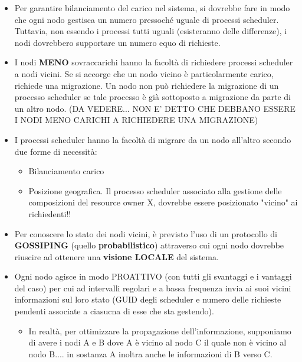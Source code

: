 \documentclass[10pt,a4paper]{article}
\begin{document}
\begin{itemize}
\item Per garantire bilanciamento del carico nel sistema, si dovrebbe fare in modo che ogni nodo gestisca un numero pressoché uguale di processi scheduler. Tuttavia, non essendo i processi tutti uguali (esisteranno delle differenze), i nodi dovrebbero supportare un numero equo di richieste.

\item I nodi \textbf{MENO} sovraccarichi hanno la facoltà di richiedere processi scheduler a nodi vicini. Se si accorge che un nodo vicino è particolarmente carico, richiede una migrazione. Un nodo non può richiedere la migrazione di un processo scheduler se tale processo è già sottoposto a migrazione da parte di un altro nodo. (DA VEDERE... NON E' DETTO CHE DEBBANO ESSERE I NODI MENO CARICHI A RICHIEDERE UNA MIGRAZIONE)

\item I processi scheduler hanno la facoltà di migrare da un nodo all'altro secondo due forme di necessità:
\begin{itemize}
\item Bilanciamento carico
\item Posizione geografica. Il processo scheduler associato alla gestione delle composizioni del resource owner X, dovrebbe essere posizionato "vicino" ai richiedenti!!
\end{itemize}

\item Per conoscere lo stato dei nodi vicini, è previsto l'uso di un protocollo di \textbf{GOSSIPING} (quello \textbf{probabilistico}) attraverso cui ogni nodo dovrebbe riuscire ad ottenere una \textbf{visione LOCALE} del sistema.

\item Ogni nodo agisce in modo PROATTIVO (con tutti gli svantaggi e i vantaggi del caso) per cui ad intervalli regolari e a bassa frequenza invia ai suoi vicini informazioni sul loro stato (GUID degli scheduler e numero delle richieste pendenti associate a ciasucna di esse che sta gestendo).

\begin{itemize}
\item In realtà, per ottimizzare la propagazione dell'informazione, supponiamo di avere i nodi A e B dove A è vicino al nodo C il quale non è vicino al nodo B.... in sostanza A inoltra anche le informazioni di B verso C.
\end{itemize}


\end{itemize}
\end{document}
